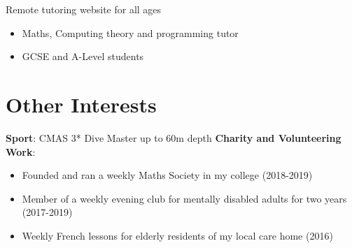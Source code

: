 \documentclass{my_cv}
\begin{document}
Remote tutoring website for all ages
\begin{itemize}
\itemsep0em 
\item Maths, Computing theory and programming tutor
\item GCSE and A-Level students
\end{itemize}

\section{Other Interests}
\textbf{Sport}: CMAS 3* Dive Master up to 60m depth\newline
\textbf{Charity and Volunteering Work}:
\begin{itemize}
\itemsep0em 
\item Founded and ran a weekly Maths Society in my college (2018-2019) 
\item Member of a weekly evening club for mentally disabled adults for two years (2017-2019) 
\item Weekly French lessons for elderly residents of my local care home (2016)
\end{itemize}
\end{document}
